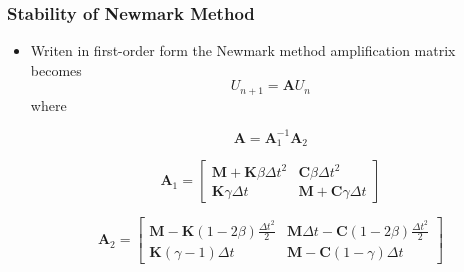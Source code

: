 \documentclass[xcolor=svgnames,9pt]{beamer}
\theoremstyle{remark}
\begin{document}
		\begin{frame}
  			\frametitle{Stability of Newmark Method}
			\begin{itemize}
				\item Writen in first-order form the Newmark method amplification matrix becomes
				\begin{equation}
					U_{n+1} = \textbf{A}U_n
				\end{equation}
where 

				\begin{equation}
					\textbf{A} = \textbf{A}_1^{-1}\textbf{A}_2
				\end{equation}

				\begin{equation}
					\textbf{A}_1 = \begin{bmatrix} \textbf{M}+ \textbf{K} \beta \Delta t^2 & \textbf{C} \beta \Delta t^2 \\
\textbf{K} \gamma \Delta t & \textbf{M} + \textbf{C}\gamma \Delta t\end{bmatrix} 
				\end{equation}

				\begin{equation}
					\textbf{A}_2 = 
						\begin{bmatrix} 
						\textbf{M}- \textbf{K}(1 - 2\beta)\frac{\Delta t^2}{2} & \textbf{M} \Delta t -  \textbf{C}(1 - 2\beta)\frac{\Delta t^2}{2} \\
						\textbf{K}(\gamma - 1)\Delta t & \textbf{M} - \textbf{C}(1 - \gamma)\Delta t
						\end{bmatrix}
				\end{equation}
			\end{itemize}
		\end{frame}
\end{document}
